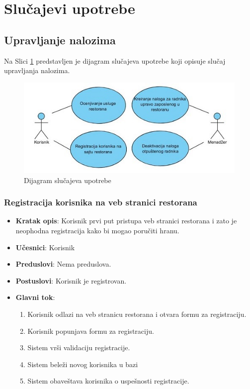 \newpage
\section{Slu\v cajevi upotrebe}
\subsection{Upravljanje nalozima}

Na Slici \ref{fig:slika3} predstavljen je dijagram slučajeva upotrebe koji opisuje slučaj upravljanja nalozima.

\begin{figure}[!h]
    \includegraphics[width=1\textwidth]{slike/Upravljanje_nalozima.JPG}
    \caption{Dijagram slučajeva upotrebe}
    \label{fig:slika3}
\end{figure}

\subsubsection{Registracija korisnika na veb stranici restorana}

\begin{itemize}
    \item \textbf{Kratak opis}:
    Korisnik prvi put pristupa veb stranici restorana i zato je neophodna registracija kako bi mogao poručiti hranu.
    \item \textbf{Učesnici}:
    Korisnik
    \item \textbf{Preduslovi}:
    Nema preduslova. 
    \item \textbf{Postuslovi}:
    Korisnik je registrovan. 
    \item \textbf{Glavni tok}:
    \begin{enumerate}
        \item Korisnik odlazi na veb stranicu restorana i otvara formu za registraciju.
        \item Korisnik popunjava formu za registraciju.
        \item Sistem vrši validaciju registracije.
        \item Sistem beleži novog korisnika u bazi
        \item Sistem obaveštava korisnika o uspešnosti registracije.
    \end{enumerate}
\end{itemize}



